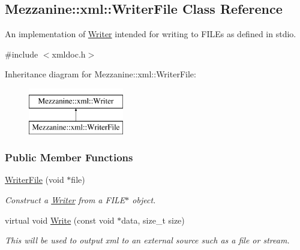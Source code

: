\hypertarget{classMezzanine_1_1xml_1_1WriterFile}{
\subsection{Mezzanine::xml::WriterFile Class Reference}
\label{classMezzanine_1_1xml_1_1WriterFile}
}


An implementation of \hyperlink{classMezzanine_1_1xml_1_1Writer}{Writer} intended for writing to FILEs as defined in stdio.  




{\ttfamily \#include $<$xmldoc.h$>$}

Inheritance diagram for Mezzanine::xml::WriterFile:\begin{figure}[H]
\begin{center}
\leavevmode
\includegraphics[height=2.000000cm]{classMezzanine_1_1xml_1_1WriterFile}
\end{center}
\end{figure}
\subsubsection*{Public Member Functions}
\begin{DoxyCompactItemize}
\item 
\hyperlink{classMezzanine_1_1xml_1_1WriterFile_ad4a253faa011360158f1cb0ae4068b9b}{WriterFile} (void $\ast$file)
\begin{DoxyCompactList}\small\item\em Construct a \hyperlink{classMezzanine_1_1xml_1_1Writer}{Writer} from a FILE$\ast$ object. \item\end{DoxyCompactList}\item 
virtual void \hyperlink{classMezzanine_1_1xml_1_1WriterFile_a3f591f3c56973db7dce2d934313c54c7}{Write} (const void $\ast$data, size\_\-t size)
\begin{DoxyCompactList}\small\item\em This will be used to output xml to an external source such as a file or stream. \item\end{DoxyCompactList}\end{DoxyCompactItemize}


